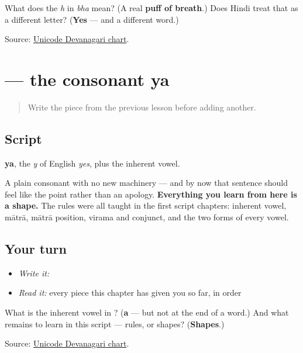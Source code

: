 \begin{tcolorbox}[breakable,colback=teal!4,colframe=teal!35!black,title={Before you move on}]
What does the \emph{h} in \emph{bha} mean? (A real \textbf{puff of breath}.) Does Hindi treat that as a different letter? (\textbf{Yes} — and a different word.)

Source: \href{https://www.unicode.org/charts/PDF/U0900.pdf}{Unicode Devanagari chart}.
\end{tcolorbox}
\section[\texorpdfstring{\hi{य} (ya)}{य (ya)}]{ — the consonant ya}

\label{lesson:HI-W12-ya}



\begin{quote}
Write the piece from the previous lesson before adding another.
\end{quote}

\subsection*{Script}

\begin{quote}
\end{quote}

\textbf{ya}, the \emph{y} of English \emph{yes}, plus the inherent vowel.

A plain consonant with no new machinery — and by now that sentence should feel like the point rather than an apology. \textbf{Everything you learn from here is a shape.} The rules were all taught in the first script chapters: inherent vowel, mātrā, mātrā position, virama and conjunct, and the two forms of every vowel.

\subsection*{Your turn}
\begin{itemize}
\raggedright
  \item \emph{Write it:} 
  \item \emph{Read it:} every piece this chapter has given you so far, in order
\end{itemize}

\begin{tcolorbox}[breakable,colback=teal!4,colframe=teal!35!black,title={Before you move on}]
What is the inherent vowel in \textbf{}? (\textbf{a} — but not at the end of a word.) And what remains to learn in this script — rules, or shapes? (\textbf{Shapes}.)

Source: \href{https://www.unicode.org/charts/PDF/U0900.pdf}{Unicode Devanagari chart}.
\end{tcolorbox}
